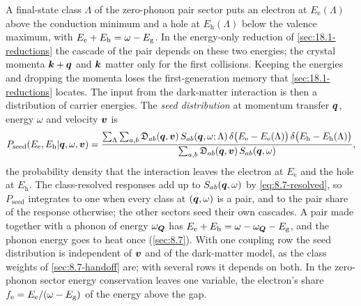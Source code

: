 A final-state class $\Lambda$ of the zero-phonon pair sector puts an electron at $E_{\mathrm{e}}(\Lambda)$ above the conduction minimum and a hole at $E_{\mathrm{h}}(\Lambda)$ below the valence maximum, with $E_{\mathrm{e}} + E_{\mathrm{h}} = \omega - E_{\mathrm{g}}$. In the energy-only reduction of \cref{sec:18.1-reductions} the cascade of the pair depends on these two energies; the crystal momenta $\bm{k} + \bm{q}$ and $\bm{k}$ matter only for the first collisions. Keeping the energies and dropping the momenta loses the first-generation memory that \cref{sec:18.1-reductions} locates. The input from the dark-matter interaction is then a distribution of carrier energies. The \emph{seed distribution} at momentum transfer $\bm{q}$, energy $\omega$ and velocity $\bm{v}$ is
\begin{equation}
  P_{\mathrm{seed}}(E_{\mathrm{e}},E_{\mathrm{h}}|\bm{q},\omega,\bm{v}) = \frac{\sum_\Lambda\sum_{a,b}\mathfrak{D}_{ab}(\bm{q},\bm{v})\,S_{ab}(\bm{q},\omega;\Lambda)\,\delta\bigl(E_{\mathrm{e}} - E_{\mathrm{e}}(\Lambda)\bigr)\,\delta\bigl(E_{\mathrm{h}} - E_{\mathrm{h}}(\Lambda)\bigr)}{\sum_{a,b}\mathfrak{D}_{ab}(\bm{q},\bm{v})\,S_{ab}(\bm{q},\omega)} ,
  \label{eq:18.3-seed}
\end{equation}
the probability density that the interaction leaves the electron at $E_{\mathrm{e}}$ and the hole at $E_{\mathrm{h}}$. The class-resolved responses add up to $S_{ab}(\bm{q},\omega)$ by \cref{eq:8.7-resolved}, so $P_{\mathrm{seed}}$ integrates to one when every class at $(\bm{q},\omega)$ is a pair, and to the pair share of the response otherwise; the other sectors seed their own cascades. A pair made together with a phonon of energy $\omega_{\bm{Q}}$ has $E_{\mathrm{e}} + E_{\mathrm{h}} = \omega - \omega_{\bm{Q}} - E_{\mathrm{g}}$, and the phonon energy goes to heat once (\cref{sec:8.7}). With one coupling row the seed distribution is independent of $\bm{v}$ and of the dark-matter model, as the class weights of \cref{sec:8.7-handoff} are; with several rows it depends on both. In the zero-phonon sector energy conservation leaves one variable, the electron's share $f_{\mathrm{e}} = E_{\mathrm{e}}/(\omega - E_{\mathrm{g}})$ of the energy above the gap.

